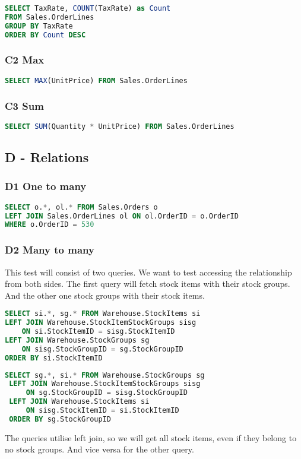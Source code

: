 \begin{lstlisting}[language=SQL]
SELECT TaxRate, COUNT(TaxRate) as Count 
FROM Sales.OrderLines 
GROUP BY TaxRate 
ORDER BY Count DESC
\end{lstlisting}

\subsubsection*{C2 Max}

\begin{lstlisting}[language=SQL]
SELECT MAX(UnitPrice) FROM Sales.OrderLines
\end{lstlisting}

\subsubsection*{C3 Sum}

\begin{lstlisting}[language=SQL]
SELECT SUM(Quantity * UnitPrice) FROM Sales.OrderLines
\end{lstlisting}

\subsection{D - Relations}

\subsubsection*{D1 One to many}

\begin{lstlisting}[language=SQL]
SELECT o.*, ol.* FROM Sales.Orders o
LEFT JOIN Sales.OrderLines ol ON ol.OrderID = o.OrderID
WHERE o.OrderID = 530
\end{lstlisting}

\subsubsection*{D2 Many to many}

This test will consist of two queries. We want to test accessing the relationship from both sides. The first query will fetch stock items with their stock groups. And the other one stock groups with their stock items.
\begin{lstlisting}[language=SQL]
SELECT si.*, sg.* FROM Warehouse.StockItems si
LEFT JOIN Warehouse.StockItemStockGroups sisg
    ON si.StockItemID = sisg.StockItemID
LEFT JOIN Warehouse.StockGroups sg
    ON sisg.StockGroupID = sg.StockGroupID
ORDER BY si.StockItemID
\end{lstlisting}
\begin{lstlisting}[language=SQL]
 SELECT sg.*, si.* FROM Warehouse.StockGroups sg
 LEFT JOIN Warehouse.StockItemStockGroups sisg
     ON sg.StockGroupID = sisg.StockGroupID
 LEFT JOIN Warehouse.StockItems si
     ON sisg.StockItemID = si.StockItemID
 ORDER BY sg.StockGroupID
\end{lstlisting}
The queries utilise left join, so we will get all stock items, even if they belong to no stock groups. And vice versa for the other query.

